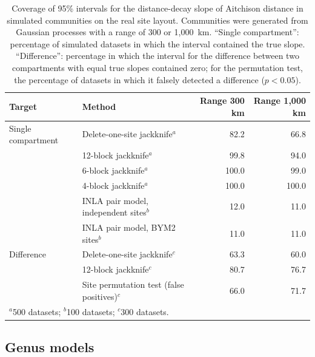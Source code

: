 \documentclass[11pt]{article}
\begin{document}
\begin{table}[ht]
\centering
\caption{Coverage of 95\% intervals for the distance-decay slope of Aitchison distance in simulated communities on the real site layout. Communities were generated from Gaussian processes with a range of 300 or 1,000~km. ``Single compartment'': percentage of simulated datasets in which the interval contained the true slope. ``Difference'': percentage in which the interval for the difference between two compartments with equal true slopes contained zero; for the permutation test, the percentage of datasets in which it falsely detected a difference ($p < 0.05$).}
\label{tab:decay_calibration}
\small
\begin{tabular}{llrr}
\toprule
Target & Method & Range 300 km & Range 1,000 km \\
\midrule
Single compartment & Delete-one-site jackknife$^a$          & 82.2  & 66.8  \\
                   & 12-block jackknife$^a$                 & 99.8  & 94.0  \\
                   & 6-block jackknife$^a$                  & 100.0 & 99.0  \\
                   & 4-block jackknife$^a$                  & 100.0 & 100.0 \\
                   & INLA pair model, independent sites$^b$ & 12.0  & 11.0  \\
                   & INLA pair model, BYM2 sites$^b$        & 11.0  & 11.0  \\
\addlinespace
Difference         & Delete-one-site jackknife$^c$          & 63.3  & 60.0  \\
                   & 12-block jackknife$^c$                 & 80.7  & 76.7  \\
                   & Site permutation test (false positives)$^c$ & 66.0 & 71.7 \\
\bottomrule
\multicolumn{4}{l}{\footnotesize $^a$500 datasets; $^b$100 datasets; $^c$300 datasets.}
\end{tabular}
\end{table}

\subsection{Genus models}\label{genus_models}
\end{document}
